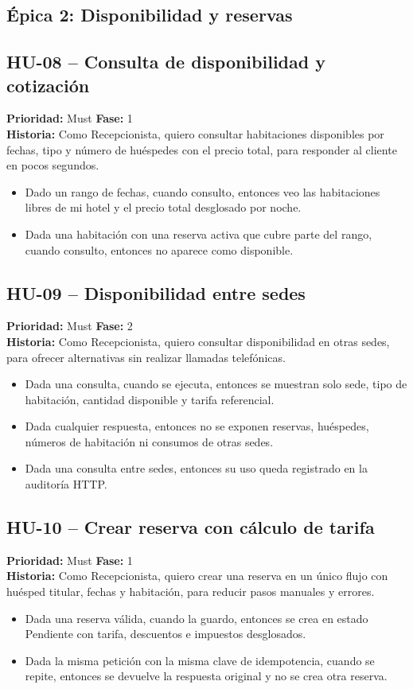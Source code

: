 \documentclass[12pt,a4paper]{article}
\newcommand{\HU}[5]{%
  \subsection*{#1 -- #2}
  \noindent\textbf{Prioridad:} #3 \hfill \textbf{Fase:} #4\\
  \noindent\textbf{Historia:} #5
  \vspace{2mm}
}
\begin{document}
\subsection{Épica 2: Disponibilidad y reservas}

\HU{HU-08}{Consulta de disponibilidad y cotización}{Must}{1}{Como Recepcionista, quiero consultar habitaciones disponibles por fechas, tipo y número de huéspedes con el precio total, para responder al cliente en pocos segundos.}
\begin{itemize}
  \item Dado un rango de fechas, cuando consulto, entonces veo las habitaciones libres de mi hotel y el precio total desglosado por noche.
  \item Dada una habitación con una reserva activa que cubre parte del rango, cuando consulto, entonces no aparece como disponible.
\end{itemize}

\HU{HU-09}{Disponibilidad entre sedes}{Must}{2}{Como Recepcionista, quiero consultar disponibilidad en otras sedes, para ofrecer alternativas sin realizar llamadas telefónicas.}
\begin{itemize}
  \item Dada una consulta, cuando se ejecuta, entonces se muestran solo sede, tipo de habitación, cantidad disponible y tarifa referencial.
  \item Dada cualquier respuesta, entonces no se exponen reservas, huéspedes, números de habitación ni consumos de otras sedes.
  \item Dada una consulta entre sedes, entonces su uso queda registrado en la auditoría HTTP.
\end{itemize}

\HU{HU-10}{Crear reserva con cálculo de tarifa}{Must}{1}{Como Recepcionista, quiero crear una reserva en un único flujo con huésped titular, fechas y habitación, para reducir pasos manuales y errores.}
\begin{itemize}
  \item Dada una reserva válida, cuando la guardo, entonces se crea en estado Pendiente con tarifa, descuentos e impuestos desglosados.
  \item Dada la misma petición con la misma clave de idempotencia, cuando se repite, entonces se devuelve la respuesta original y no se crea otra reserva.
\end{itemize}
\end{document}
